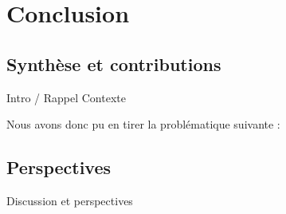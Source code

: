 \chapter{Conclusion}
\minitoc
\label{conclusion}
\section{Synthèse et contributions}
Intro / Rappel Contexte

Nous avons donc pu en tirer la problématique suivante :


\section{Perspectives}


Discussion et perspectives
